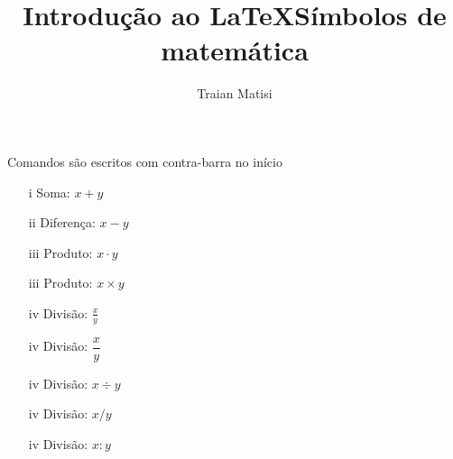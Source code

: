 \documentclass[a4paper, 14pt]{article}
\title{Introdução ao \LaTeX}
\author{Traian Matisi}
\begin{document}
\maketitle

Comandos são escritos com contra-barra no início\\

\title{Símbolos de matemática}

\begin{itemize} %

\item [i] Soma: $x+y$
\item [ii] Diferença: $x-y$
\item [iii] Produto: $x\cdot y$
\item [iii] Produto: $x\times y$
\item [iv] Divisão: $\frac{x}{y}$
\item [iv] Divisão: $\dfrac{x}{y}$
\item [iv] Divisão: $x\div y$
\item [iv] Divisão: $x / y$
\item [iv] Divisão: $x : y$

\end{itemize}
\end{document}
